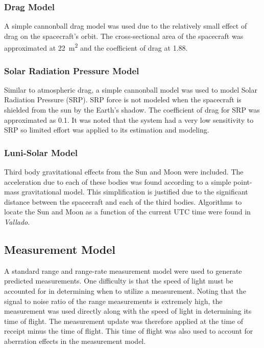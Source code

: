 \documentclass[11pt]{article}
\begin{document}
\subsubsection{Drag Model}

A simple cannonball drag model was used due to the relatively small effect of drag on the spacecraft's orbit. The cross-sectional area of the spacecraft was approximated at \SI{22}{\meter\squared} and the coefficient of drag at 1.88.

\subsubsection{Solar Radiation Pressure Model}

Similar to atmospheric drag, a simple cannonball model was used to model Solar Radiation Pressure (SRP). SRP force is not modeled when the spacecraft is shielded from the sun by the Earth's shadow. The coefficient of drag for SRP was approximated as 0.1. It was noted that the system had a very low sensitivity to SRP so limited effort was applied to its estimation and modeling.

\subsubsection{Luni-Solar Model}

Third body gravitational effects from the Sun and Moon were included. The acceleration due to each of these bodies was found according to a simple point-mass gravitational model. This simplification is justified due to the significant distance between the spacecraft and each of the third bodies. Algorithms to locate the Sun and Moon as a function of the current UTC time were found in \textit{Vallado}.

\subsection{Measurement Model}

A standard range and range-rate measurement model were used to generate predicted measurements. One difficulty is that the speed of light must be accounted for in determining when to utilize a measurement. Noting that the signal to noise ratio of the range measurements is extremely high, the measurement was used directly along with the speed of light in determining its time of flight. The measurement update was therefore applied at the time of receipt minus the time of flight. This time of flight was also used to account for aberration effects in the measurement model. \\
\end{document}
